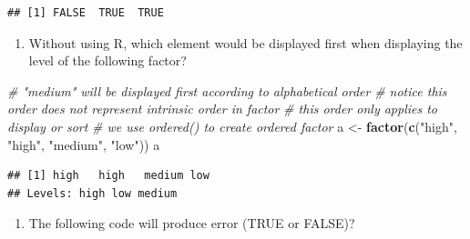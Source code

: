 \documentclass[]{book}
\newenvironment{Shaded}{\begin{snugshade}}{\end{snugshade}}
\newcommand{\CommentTok}[1]{\textcolor[rgb]{0.56,0.35,0.01}{\textit{#1}}}
\newcommand{\KeywordTok}[1]{\textcolor[rgb]{0.13,0.29,0.53}{\textbf{#1}}}
\newcommand{\NormalTok}[1]{#1}
\newcommand{\StringTok}[1]{\textcolor[rgb]{0.31,0.60,0.02}{#1}}
\providecommand{\tightlist}{%
  \setlength{\itemsep}{0pt}\setlength{\parskip}{0pt}}
\begin{document}
\begin{verbatim}
## [1] FALSE  TRUE  TRUE
\end{verbatim}

\begin{enumerate}
\def\labelenumi{\arabic{enumi}.}
\setcounter{enumi}{8}
\tightlist
\item
  Without using R, which element would be displayed first when displaying the level of the following factor?
\end{enumerate}

\begin{Shaded}
\begin{Highlighting}[]
\CommentTok{# "medium" will be displayed first according to alphabetical order}
\CommentTok{# notice this order does not represent intrinsic order in factor}
\CommentTok{# this order only applies to display or sort}
\CommentTok{# we use ordered() to create ordered factor}
\NormalTok{a <-}\StringTok{ }\KeywordTok{factor}\NormalTok{(}\KeywordTok{c}\NormalTok{(}\StringTok{"high"}\NormalTok{, }\StringTok{"high"}\NormalTok{, }\StringTok{"medium"}\NormalTok{, }\StringTok{"low"}\NormalTok{))}
\NormalTok{a}
\end{Highlighting}
\end{Shaded}

\begin{verbatim}
## [1] high   high   medium low   
## Levels: high low medium
\end{verbatim}

\begin{enumerate}
\def\labelenumi{\arabic{enumi}.}
\setcounter{enumi}{9}
\tightlist
\item
  The following code will produce error (TRUE or FALSE)?
\end{enumerate}


\end{document}
